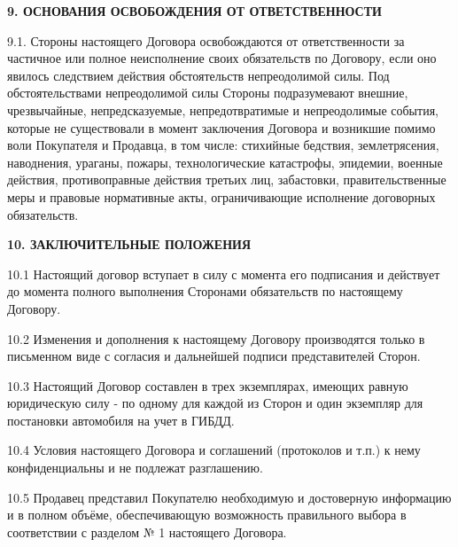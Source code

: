 \documentclass[a4paper,12pt]{article}
\begin{document}
\newpage
\begin{center}
 \vspace{1 ex}
 \textbf{9. ОСНОВАНИЯ  ОСВОБОЖДЕНИЯ ОТ ОТВЕТСТВЕННОСТИ }
 \vspace{1ex}
    \end{center}

\begin{description}\item9.1. Стороны настоящего Договора освобождаются от ответственности за частичное или полное неисполнение своих обязательств по Договору, если оно явилось следствием действия обстоятельств непреодолимой силы. Под обстоятельствами непреодолимой силы Стороны подразумевают внешние, чрезвычайные, непредсказуемые, непредотвратимые и непреодолимые события, которые не существовали в момент заключения Договора и возникшие помимо воли Покупателя и Продавца, в том числе: стихийные бедствия, землетрясения, наводнения, ураганы, пожары, технологические катастрофы, эпидемии, военные действия, противоправные действия третьих лиц, забастовки, правительственные меры и правовые нормативные акты, ограничивающие исполнение договорных обязательств. \end{description}

\begin{center}
 \vspace{1 ex}
 \textbf{10. ЗАКЛЮЧИТЕЛЬНЫЕ ПОЛОЖЕНИЯ }
 \vspace{1ex}
    \end{center}

\begin{description}\item10.1 Настоящий договор вступает в силу с момента его подписания и действует до момента полного выполнения Сторонами обязательств по настоящему Договору.\end{description}
\begin{description}\item10.2 Изменения и дополнения к настоящему Договору производятся только в письменном виде с согласия и дальнейшей подписи представителей Сторон.\end{description}
\begin{description}\item10.3 Настоящий Договор составлен в трех экземплярах, имеющих равную юридическую силу -  по одному для каждой из Сторон и один экземпляр для постановки автомобиля на учет в ГИБДД.\end{description}
\begin{description}\item10.4 Условия настоящего Договора и соглашений (протоколов и т.п.) к нему конфиденциальны и не подлежат разглашению.\end{description}
\begin{description}\item10.5 Продавец представил Покупателю необходимую и достоверную информацию и  в полном объёме, обеспечивающую возможность правильного выбора в соответствии с разделом № 1 настоящего Договора. \end{description}
\end{document}
